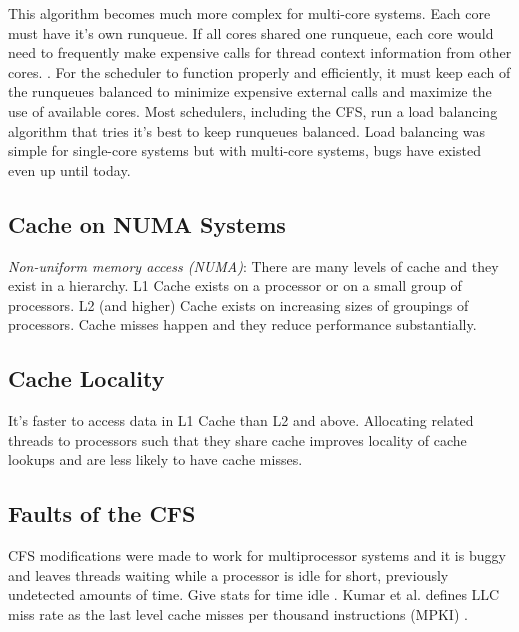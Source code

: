 \documentclass{sig-alternate}
\begin{document}
This algorithm becomes much more complex for multi-core systems. Each core must have it's own runqueue. If all cores shared one runqueue, each core would need to frequently make expensive calls for thread context information from other cores. \cite{Lozi:2016}. For the scheduler to function properly and efficiently, it must keep each of the runqueues balanced to minimize expensive external calls and maximize the use of available cores. Most schedulers, including the CFS, run a load balancing algorithm that tries it's best to keep runqueues balanced. Load balancing was simple for single-core systems but with multi-core systems, bugs have existed even up until today. 


\subsection{Cache on NUMA Systems}
\label{sec:cache}

\emph{Non-uniform memory access (NUMA)}:
There are many levels of cache and they exist in a hierarchy. L1 Cache exists on a processor or on a small group of processors. L2 (and higher) Cache exists on increasing sizes of groupings of processors.
Cache misses happen and they reduce performance substantially.

\subsection{Cache Locality}
\label{sec:cachelocality}

It's faster to access data in L1 Cache than L2 and above. Allocating related threads to processors such that they share cache improves locality of cache lookups and are less likely to have cache misses.

\subsection{Faults of the CFS}
\label{sec:cfsfaults}

CFS modifications were made to work for multiprocessor systems and it is buggy and leaves threads waiting while a processor is idle for short, previously undetected amounts of time. Give stats for time idle \cite{Lozi:2016}. Kumar et al. defines LLC miss rate as the last level cache misses per thousand instructions (MPKI) \cite{KumarEtal:2014}.
\end{document}
